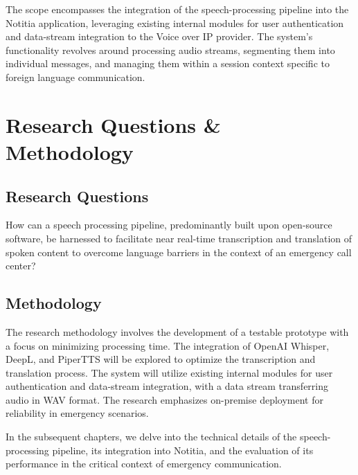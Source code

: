 The scope encompasses the integration of the speech-processing pipeline into the Notitia application, leveraging 
existing internal modules for user authentication and data-stream integration to the Voice over IP provider. The 
system's functionality revolves around processing audio streams, segmenting them into individual messages, and managing 
them within a session context specific to foreign language communication.


\section{Research Questions \& Methodology}

\subsection{Research Questions}

How can a speech processing pipeline, predominantly built upon open-source software, be harnessed to facilitate near 
real-time transcription and translation of spoken content to overcome language barriers in the context of an emergency 
call center?

\subsection{Methodology}

The research methodology involves the development of a testable prototype with a focus on minimizing processing time. 
The integration of OpenAI Whisper, DeepL, and PiperTTS will be explored to optimize the transcription and translation 
process. The system will utilize existing internal modules for user authentication and data-stream integration, with a 
data stream transferring audio in WAV format. The research emphasizes on-premise deployment for reliability in 
emergency scenarios.

In the subsequent chapters, we delve into the technical details of the speech-processing pipeline, its integration into 
Notitia, and the evaluation of its performance in the critical context of emergency communication.

